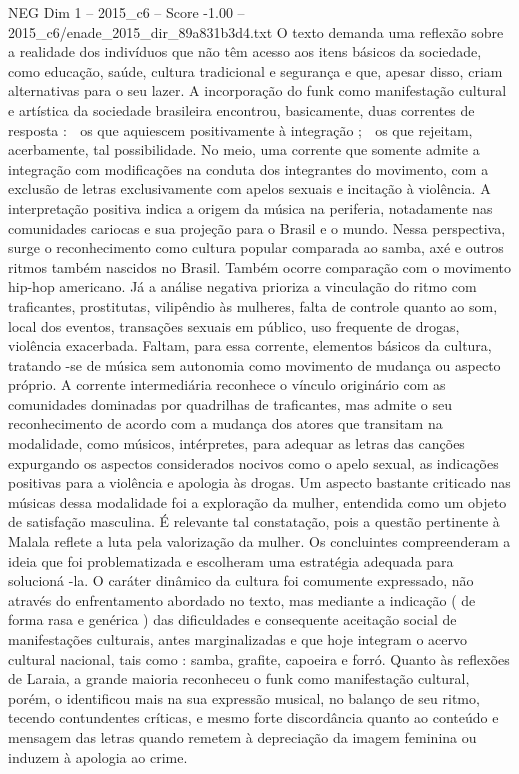 \begin{textsample}{NEG Dim 1 – 2015\_c6 – Score -1.00 – 2015\_c6/enade\_2015\_dir\_89a831b3d4.txt}
O texto demanda uma reflexão sobre a realidade dos indivíduos que não têm acesso aos itens básicos da sociedade, como educação, saúde, cultura tradicional e segurança e que, apesar disso, criam alternativas para o seu lazer.
A incorporação do funk como manifestação cultural e artística da sociedade brasileira encontrou, basicamente, duas correntes de resposta :  os que aquiescem positivamente à integração ;  os que rejeitam, acerbamente, tal possibilidade.
No meio, uma corrente que somente admite a integração com modificações na conduta dos integrantes do movimento, com a exclusão de letras exclusivamente com apelos sexuais e incitação à violência.
A interpretação positiva indica a origem da música na periferia, notadamente nas comunidades cariocas e sua projeção para o Brasil e o mundo.
Nessa perspectiva, surge o reconhecimento como cultura popular comparada ao samba, axé e outros ritmos também nascidos no Brasil.
Também ocorre comparação com o movimento hip-hop americano.
Já a análise negativa prioriza a vinculação do ritmo com traficantes, prostitutas, vilipêndio às mulheres, falta de controle quanto ao som, local dos eventos, transações sexuais em público, uso frequente de drogas, violência exacerbada.
Faltam, para essa corrente, elementos básicos da cultura, tratando -se de música sem autonomia como movimento de mudança ou aspecto próprio.
A corrente intermediária reconhece o vínculo originário com as comunidades dominadas por quadrilhas de traficantes, mas admite o seu reconhecimento de acordo com a mudança dos atores que transitam na modalidade, como músicos, intérpretes, para adequar as letras das canções expurgando os aspectos considerados nocivos como o apelo sexual, as indicações positivas para a violência e apologia às drogas.
Um aspecto bastante criticado nas músicas dessa modalidade foi a exploração da mulher, entendida como um objeto de satisfação masculina.
É relevante tal constatação, pois a questão pertinente à Malala reflete a luta pela valorização da mulher.
Os concluintes compreenderam a ideia que foi problematizada e escolheram uma estratégia adequada para solucioná -la.
O caráter dinâmico da cultura foi comumente expressado, não através do enfrentamento abordado no texto, mas mediante a indicação ( de forma rasa e genérica ) das dificuldades e consequente aceitação social de manifestações culturais, antes marginalizadas e que hoje integram o acervo cultural nacional, tais como : samba, grafite, capoeira e forró.
Quanto às reflexões de Laraia, a grande maioria reconheceu o funk como manifestação cultural, porém, o identificou mais na sua expressão musical, no balanço de seu ritmo, tecendo contundentes críticas, e mesmo forte discordância quanto ao conteúdo e mensagem das letras quando remetem à depreciação da imagem feminina ou induzem à apologia ao crime.

\end{textsample}
